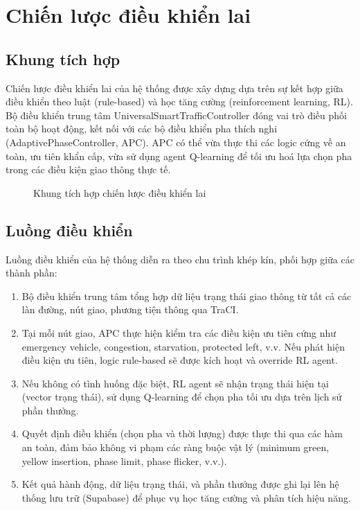 \chapter{Chiến lược điều khiển lai}

\section{Khung tích hợp}

Chiến lược điều khiển lai của hệ thống được xây dựng dựa trên sự kết hợp giữa điều khiển theo luật (rule-based) và học tăng cường (reinforcement learning, RL). Bộ điều khiển trung tâm UniversalSmartTrafficController đóng vai trò điều phối toàn bộ hoạt động, kết nối với các bộ điều khiển pha thích nghi (AdaptivePhaseController, APC). APC có thể vừa thực thi các logic cứng về an toàn, ưu tiên khẩn cấp, vừa sử dụng agent Q-learning để tối ưu hoá lựa chọn pha trong các điều kiện giao thông thực tế.

\begin{figure}[H]
    \centering
    \caption{Khung tích hợp chiến lược điều khiển lai}
    \label{fig:hybrid_control_framework}
\end{figure}

\section{Luồng điều khiển}

Luồng điều khiển của hệ thống diễn ra theo chu trình khép kín, phối hợp giữa các thành phần:

\begin{enumerate}
    \item Bộ điều khiển trung tâm tổng hợp dữ liệu trạng thái giao thông từ tất cả các làn đường, nút giao, phương tiện thông qua TraCI.
    \item Tại mỗi nút giao, APC thực hiện kiểm tra các điều kiện ưu tiên cứng như emergency vehicle, congestion, starvation, protected left, v.v. Nếu phát hiện điều kiện ưu tiên, logic rule-based sẽ được kích hoạt và override RL agent.
    \item Nếu không có tình huống đặc biệt, RL agent sẽ nhận trạng thái hiện tại (vector trạng thái), sử dụng Q-learning để chọn pha tối ưu dựa trên lịch sử phần thưởng.
    \item Quyết định điều khiển (chọn pha và thời lượng) được thực thi qua các hàm an toàn, đảm bảo không vi phạm các ràng buộc vật lý (minimum green, yellow insertion, phase limit, phase flicker, v.v.).
    \item Kết quả hành động, dữ liệu trạng thái, và phần thưởng được ghi lại lên hệ thống lưu trữ (Supabase) để phục vụ học tăng cường và phân tích hiệu năng.
\end{enumerate}

